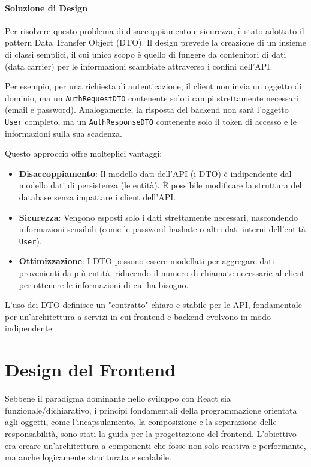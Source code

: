 \documentclass[12pt,a4paper,openright,twoside]{book}
\begin{document}
\paragraph{Soluzione di Design}
Per risolvere questo problema di disaccoppiamento e sicurezza, è stato adottato il pattern Data Transfer Object (DTO). Il design prevede la creazione di un insieme di classi semplici, il cui unico scopo è quello di fungere da contenitori di dati (data carrier) per le informazioni scambiate attraverso i confini dell'API.

Per esempio, per una richiesta di autenticazione, il client non invia un oggetto di dominio, ma un \texttt{AuthRequestDTO} contenente solo i campi strettamente necessari (email e password). Analogamente, la risposta del backend non sarà l'oggetto \texttt{User} completo, ma un \texttt{AuthResponseDTO} contenente solo il token di accesso e le informazioni sulla sua scadenza.

Questo approccio offre molteplici vantaggi:
\begin{itemize}
    \item \textbf{Disaccoppiamento}: Il modello dati dell'API (i DTO) è indipendente dal modello dati di persistenza (le entità). È possibile modificare la struttura del database senza impattare i client dell'API.
    \item \textbf{Sicurezza}: Vengono esposti solo i dati strettamente necessari, nascondendo informazioni sensibili (come le password hashate o altri dati interni dell'entità \texttt{User}).
    \item \textbf{Ottimizzazione}: I DTO possono essere modellati per aggregare dati provenienti da più entità, riducendo il numero di chiamate necessarie al client per ottenere le informazioni di cui ha bisogno.
\end{itemize}

L'uso dei DTO definisce un "contratto" chiaro e stabile per le API, fondamentale per un'architettura a servizi in cui frontend e backend evolvono in modo indipendente.

\section{Design del Frontend}
\label{sec:design_frontend}

Sebbene il paradigma dominante nello sviluppo con React sia funzionale/dichiarativo, i principi fondamentali della programmazione orientata agli oggetti, come l'incapsulamento, la composizione e la separazione delle responsabilità, sono stati la guida per la progettazione del frontend. L'obiettivo era creare un'architettura a componenti che fosse non solo reattiva e performante, ma anche logicamente strutturata e scalabile.
\end{document}
